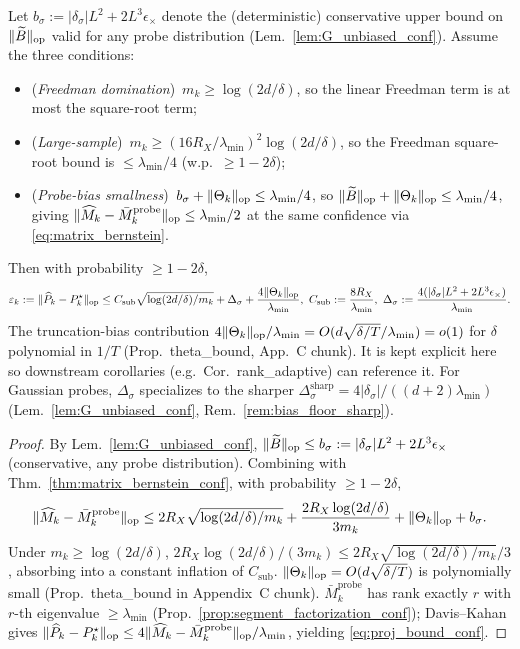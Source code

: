 \begin{corollary}
\label{cor:projector_conf}
Let $b_\sigma := |\delta_\sigma|L^2 + 2L^3\epsilon_\times$ denote the
(deterministic) conservative upper bound on $\|\widetilde B\|_{\mathrm{op}}$ valid
for any probe distribution (Lem.~\ref{lem:G_unbiased_conf}).
Assume the three conditions:
\begin{itemize}[leftmargin=1.5em,itemsep=1pt,topsep=1pt]
\item (\emph{Freedman domination})\ $m_k\ge\log(2d/\delta)$, so the
  linear Freedman term is at most the square-root term;
\item (\emph{Large-sample})\ $m_k\ge(16R_X/\lambda_{\min})^2\log(2d/\delta)$,
  so the Freedman square-root bound is $\le\lambda_{\min}/4$ (w.p.\
  $\ge 1-2\delta$);
\item (\emph{Probe-bias smallness})\ $b_\sigma+\|\Theta_k\|_{\mathrm{op}}\le\lambda_{\min}/4$,
  so $\|\widetilde B\|_{\mathrm{op}}+\|\Theta_k\|_{\mathrm{op}}\le\lambda_{\min}/4$, giving
  $\|\widehat M_k-\bar M_k^{\mathrm{probe}}\|_{\mathrm{op}}\le\lambda_{\min}/2$ at
  the same confidence via \eqref{eq:matrix_bernstein}.
\end{itemize}
Then with probability $\ge 1-2\delta$,
\begin{equation}
\varepsilon_k := \|\widehat P_k - P_k^\star\|_{\mathrm{op}}
\le C_{\mathrm{sub}}\sqrt{\log(2d/\delta)/m_k} + \Delta_\sigma + \frac{4\|\Theta_k\|_{\mathrm{op}}}{\lambda_{\min}},\
C_{\mathrm{sub}} := \frac{8 R_X}{\lambda_{\min}},\
\Delta_\sigma := \frac{4(|\delta_\sigma|L^2+2L^3\epsilon_\times)}{\lambda_{\min}}.
\label{eq:proj_bound_conf}
\end{equation}
The truncation-bias contribution $4\|\Theta_k\|_{\mathrm{op}}/\lambda_{\min} = O(d\sqrt{\delta/T}/\lambda_{\min})=o(1)$
for $\delta$ polynomial in $1/T$ (Prop.~theta\_bound, App.~C chunk). It is kept explicit here so
downstream corollaries (e.g.\ Cor.~rank\_adaptive) can reference it.
For Gaussian probes, $\Delta_\sigma$ specializes to the sharper
$\Delta_\sigma^{\mathrm{sharp}}=4|\delta_\sigma|/((d+2)\lambda_{\min})$
(Lem.~\ref{lem:G_unbiased_conf}, Rem.~\ref{rem:bias_floor_sharp}).
\end{corollary}
\begin{proof}
By Lem.~\ref{lem:G_unbiased_conf},
$\|\widetilde B\|_{\mathrm{op}}\le b_\sigma:=|\delta_\sigma|L^2+2L^3\epsilon_\times$
(conservative, any probe distribution). Combining with
Thm.~\ref{thm:matrix_bernstein_conf}, with probability $\ge 1-2\delta$,
\[
\|\widehat M_k - \bar M_k^{\mathrm{probe}}\|_{\mathrm{op}}
\le 2R_X\sqrt{\log(2d/\delta)/m_k}
+ \frac{2R_X\log(2d/\delta)}{3m_k}
+ \|\Theta_k\|_{\mathrm{op}} + b_\sigma.
\]
Under $m_k\ge\log(2d/\delta)$, $2R_X\log(2d/\delta)/(3m_k)\le 2R_X\sqrt{\log(2d/\delta)/m_k}/3$,
absorbing into a constant inflation of $C_{\mathrm{sub}}$.
$\|\Theta_k\|_{\mathrm{op}} = O(d\sqrt{\delta/T})$ is polynomially small
(Prop.~theta\_bound in Appendix~C chunk). $\bar M_k^{\mathrm{probe}}$
has rank exactly $r$ with $r$-th eigenvalue $\ge\lambda_{\min}$
(Prop.~\ref{prop:segment_factorization_conf}); Davis--Kahan gives
$\|\widehat P_k-P_k^\star\|_{\mathrm{op}}\le 4\|\widehat M_k-\bar M_k^{\mathrm{probe}}\|_{\mathrm{op}}/\lambda_{\min}$,
yielding \eqref{eq:proj_bound_conf}.
\end{proof}

